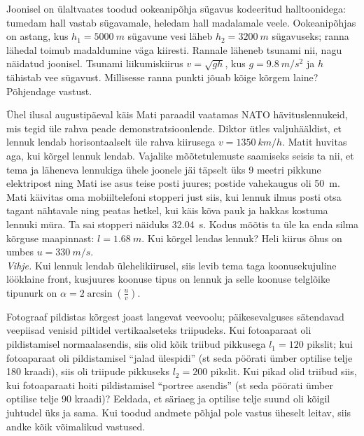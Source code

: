 \documentclass[10pt]{article}
\begin{document}
{Joonisel on ülaltvaates toodud ookeanipõhja sügavus kodeeritud halltoonidega: tumedam hall vastab sügavamale, heledam hall madalamale veele. Ookeanipõhjas on astang, kus $h_1 = \SI{5000}{m}$ sügavune vesi läheb $h_2 = \SI{3200}{m}$ sügavuseks; ranna lähedal toimub madaldumine väga kiiresti. Rannale läheneb tsunami nii, nagu näidatud joonisel. Tsunami liikumiskiirus $v = \sqrt{gh}$, kus $g = \SI{9,8}{m/s^2}$ ja $h$ tähistab vee sügavust. Millisesse ranna punkti jõuab kõige kõrgem laine? Põhjendage vastust.
\probend
\bigskip


Ühel ilusal augustipäeval käis Mati paraadil vaatamas NATO hävituslennukeid, mis
tegid üle rahva peade demonstratsioonlende. Diktor ütles valjuhääldist, et lennuk
lendab horisontaalselt üle rahva kiirusega $v=\SI{1350}{km/h}$. Matit huvitas aga, kui
kõrgel lennuk lendab. Vajalike mõõtetulemuste saamiseks seisis ta nii, et tema
ja läheneva lennukiga ühele joonele jäi täpselt üks 9 meetri pikkune elektripost
ning Mati ise asus teise posti juures; postide vahekaugus oli \SI{50}{m}. Mati käivitas oma
mobiiltelefoni stopperi just siis, kui lennuk ilmus posti otsa tagant nähtavale ning 
peatas hetkel, kui käis kõva pauk ja hakkas kostuma lennuki müra. Ta sai
stopperi näiduks \SI{32,04}{s}. Kodus
mõõtis ta üle ka enda silma kõrguse maapinnast: $l=\SI{1,68}{m}$.
Kui kõrgel lendas lennuk? Heli kiirus õhus on umbes
$u=\SI{330}{m/s}$.\\ 
\textit{Vihje.} Kui lennuk lendab
ülehelikiirusel, siis levib tema taga
koonusekujuline lööklaine front, kusjuures koonuse tipus on lennuk ja selle
koonuse telglõike
tipunurk on $\alpha=2\arcsin\left(\frac{u}{v}\right)$.
\probend
\bigskip


Fotograaf pildistas kõrgest joast langevat veevoolu; päikesevalguses sätendavad veepiisad venisid piltidel vertikaalseteks triipudeks.
Kui fotoaparaat oli pildistamisel normaalasendis, siis olid kõik triibud pikkusega $l_1 = \num{120}$ pikslit; kui fotoaparaat oli pildistamisel \enquote{jalad ülespidi} (st seda
pöörati ümber optilise telje \num{180} kraadi), siis oli triipude pikkuseks $l_2 = \num{200}$
pikslit. Kui pikad olid triibud siis, kui fotoaparaati hoiti pildistamisel \enquote{portree
asendis} (st seda pöörati ümber optilise telje \num{90} kraadi)? Eeldada, et säriaeg
ja optilise telje suund oli kõigil juhtudel üks ja sama. Kui toodud andmete
põhjal pole vastus üheselt leitav, siis andke kõik võimalikud vastused.

}
\end{document}
